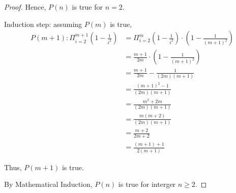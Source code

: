 \documentclass{article}
\begin{document}
\begin{enumerate}[label={(\arabic*)}]
\begin{proof}
    Hence, $P(n)$ is true for $n=2$.

    Induction step: assuming $P(m)$ is true,
    \begin{align}
        P(m+1): \Pi_{i=2}^{m+1}\left(1-\frac{1}{i^2}\right) & = \Pi_{i=2}^m\left(1-\frac{1}{i^2}\right) \cdot \left(1-\frac{1}{(m+1)^2}\right) \\
        & = \frac{m+1}{2m} \cdot \left(1-\frac{1}{(m+1)^2}\right) \\
        & = \frac{m+1}{2m} - \frac{1}{(2m)(m+1)} \\
        & = \frac{(m+1)^2 - 1}{(2m)(m+1)} \\
        & = \frac{m^2 + 2m}{(2m)(m+1)} \\
        & = \frac{m(m + 2)}{(2m)(m+1)} \\
        & = \frac{m+2}{2m+2} \\
        & = \frac{(m+1)+1}{2(m+1)}
    \end{align}

    Thus, $P(m+1)$ is true.

    By Mathematical Induction, $P(n)$ is true for interger $n \ge 2$.
\end{proof}

    
\end{enumerate}
\end{document}
